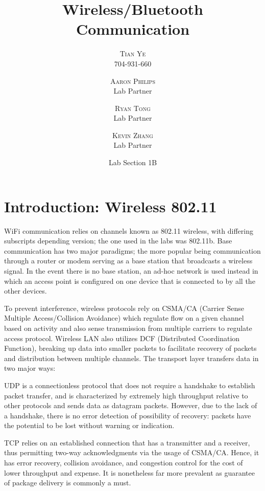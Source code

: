 \documentclass[twoside,twocolumn]{article}
\title{Wireless/Bluetooth Communication} %
\author{%
\textsc{Tian Ye} \\%
\normalsize 704-931-660 \\ %
\and %
\textsc{Aaron Philips} \\
\normalsize Lab Partner \\
\and
\textsc{Ryan Tong} \\
\normalsize Lab Partner \\
\and
\textsc{Kevin Zhang} \\%
\normalsize Lab Partner \\
}
\date{Lab Section 1B} %
\begin{document}
\maketitle


\section{Introduction: Wireless 802.11}

WiFi communication relies on channels known as 802.11 wireless, with differing subscripts depending version; the one used in the labs was 802.11b. Base communication has two major paradigms; the more popular being communication through a router or modem serving as a base station that broadcasts a wireless signal. In the event there is no base station, an ad-hoc network is used instead in which an access point is configured on one device that is connected to by all the other devices. 

\hfill

\noindent To prevent interference, wireless protocols rely on CSMA/CA (Carrier Sense Multiple Access/Collision Avoidance) which regulate flow on a given channel based on activity and also sense transmission from multiple carriers to regulate access protocol. Wireless LAN also utilizes DCF (Distributed Coordination Function), breaking up data into smaller packets to facilitate recovery of packets and distribution between multiple channels. The transport layer transfers data in two major ways:

\hfill

\noindent UDP is a connectionless protocol that does not require a handshake to establish packet transfer, and is characterized by extremely high throughput relative to other protocols and sends data as datagram packets. However, due to the lack of a handshake, there is no error detection of possibility of recovery: packets have the potential to be lost without warning or indication.

\hfill

\noindent TCP relies on an established connection that has a transmitter and a receiver, thus permitting two-way acknowledgments via the usage of CSMA/CA. Hence, it has error recovery, collision avoidance, and congestion control for the cost of lower throughput and expense. It is nonetheless far more prevalent as guarantee of package delivery is commonly a must.
\end{document}
